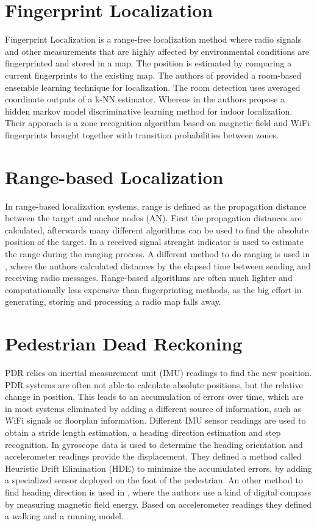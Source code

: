 \section{Fingerprint Localization}
Fingerprint Localization is a range-free localization method where radio signals and other measurements that are highly affected by environmental conditions are fingerprinted and stored in a map. The position is estimated by comparing a current fingerprints to the existing map. The authors of \cite{Taniuchi} provided a room-based ensemble learning technique for localization. The room detection uses averaged coordinate outputs of a k-NN estimator. Whereas in \cite{Carrera2} the authors propose a hidden markov model discriminative learning method for indoor localization. Their apporach is a zone recognition algorithm based on magnetic field and WiFi fingerprints brought together with transition probabilities between zones.

\section{Range-based Localization}
In range-based localization systems, range is defined as the propagation distance between the target and anchor nodes (AN). First the propagation distances are calculated, afterwards many different algorithms can be used to find the absolute position of the target. In \cite{Horus} a received signal strenght indicator is used to estimate the range during the ranging process. A different method to do ranging is used in \cite{IEEE}, where the authors calculated distances by the elapsed time between sending and receiving radio messages. Range-based algorithms are often much lighter and computationally less expensive than fingerprinting methods, as the big effort in generating, storing and processing a radio map falls away. 

\section{Pedestrian Dead Reckoning}
PDR relies on inertial measurement unit (IMU) readings to find the new position. PDR systems are often not able to calculate absolute positions, but the relative change in position. This leads to an accumulation of errors over time, which are in most systems eliminated by adding a different source of information, such as WiFi signals or floorplan information. Different IMU sensor readings are used to obtain a stride length estimation, a heading direction estimation and step recognition. In \cite{Borestein} gyroscope data is used to determine the heading orientation and accelerometer readings provide the displacement. They defined a method called Heuristic Drift Elimination (HDE) to minimize the accumulated errors, by adding a specialized sensor deployed on the foot of the pedestrian. An other method to find heading direction is used in \cite{Kakiuchi}, where the authors use a kind of digital compass by measuring magnetic field energy. Based on accelerometer readings they defined a walking and a running model.